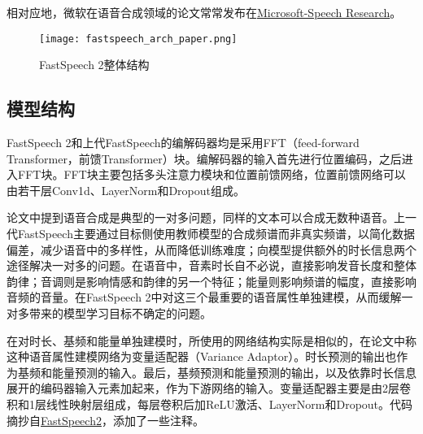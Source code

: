 \documentclass[cn,10pt,math=newtx,citestyle=gb7714-2015,bibstyle=gb7714-2015]{elegantbook}
\begin{document}
相对应地，微软在语音合成领域的论文常常发布在\href{https://speechresearch.github.io/}{Microsoft-Speech Research}。

\begin{figure}[htbp]
  \centering
  \texttt{[image: fastspeech\_arch\_paper.png]}
  \caption{FastSpeech 2整体结构 \label{fig:fastspeech_arch_paper}}
\end{figure}

\subsection{模型结构}

FastSpeech 2和上代FastSpeech的编解码器均是采用FFT（feed-forward Transformer，前馈Transformer）块。编解码器的输入首先进行位置编码，之后进入FFT块。FFT块主要包括多头注意力模块和位置前馈网络，位置前馈网络可以由若干层Conv1d、LayerNorm和Dropout组成。

论文中提到语音合成是典型的一对多问题，同样的文本可以合成无数种语音。上一代FastSpeech主要通过目标侧使用教师模型的合成频谱而非真实频谱，以简化数据偏差，减少语音中的多样性，从而降低训练难度；向模型提供额外的时长信息两个途径解决一对多的问题。在语音中，音素时长自不必说，直接影响发音长度和整体韵律；音调则是影响情感和韵律的另一个特征；能量则影响频谱的幅度，直接影响音频的音量。在FastSpeech 2中对这三个最重要的语音属性单独建模，从而缓解一对多带来的模型学习目标不确定的问题。

在对时长、基频和能量单独建模时，所使用的网络结构实际是相似的，在论文中称这种语音属性建模网络为变量适配器（Variance Adaptor）。时长预测的输出也作为基频和能量预测的输入。最后，基频预测和能量预测的输出，以及依靠时长信息展开的编码器输入元素加起来，作为下游网络的输入。变量适配器主要是由2层卷积和1层线性映射层组成，每层卷积后加ReLU激活、LayerNorm和Dropout。代码摘抄自\href{https://github.com/ming024/FastSpeech2}{FastSpeech2}，添加了一些注释。
\end{document}
